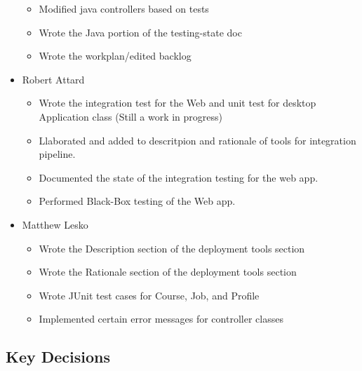 \documentclass[12pt]{article}
\begin{document}
\begin{itemize}
\begin{itemize}
            \item Modified java controllers based on tests
            \item Wrote the Java portion of the testing-state doc
            \item Wrote the workplan/edited backlog
        \end{itemize}
     \item Robert Attard
     \begin{itemize}
         \item Wrote the integration test for the Web and unit test for desktop Application class (Still a work in progress)
         \item Llaborated and added to descritpion and rationale of tools for integration pipeline.
         \item Documented the state of the integration testing for the web app.
         \item Performed Black-Box testing of the Web app.
     \end{itemize}
     \item Matthew Lesko
     \begin{itemize}
        \item Wrote the Description section of the deployment tools section
        \item Wrote the Rationale section of the deployment tools section
        \item Wrote JUnit test cases for Course, Job, and Profile
        \item Implemented certain error messages for controller classes
     \end{itemize}
 \end{itemize}

 \subsection{Key Decisions}

\end{document}
